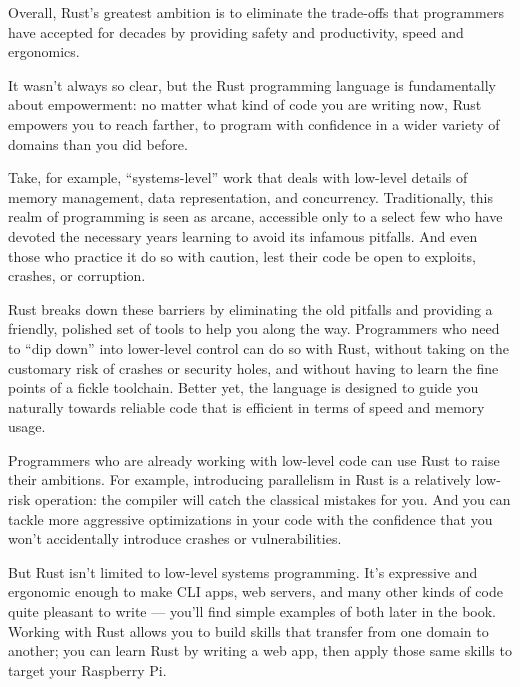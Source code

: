 Overall, Rust’s greatest ambition is to eliminate the trade-offs that programmers have accepted for decades by providing safety and productivity, speed and ergonomics. \cite{steveklabnik2018}

It wasn’t always so clear, but the Rust programming language is fundamentally about empowerment: no matter what kind of code you are writing now, Rust empowers you to reach farther, to program with confidence in a wider variety of domains than you did before.

Take, for example, “systems-level” work that deals with low-level details of memory management, data representation, and concurrency. Traditionally, this realm of programming is seen as arcane, accessible only to a select few who have devoted the necessary years learning to avoid its infamous pitfalls. And even those who practice it do so with caution, lest their code be open to exploits, crashes, or corruption.

Rust breaks down these barriers by eliminating the old pitfalls and providing a friendly, polished set of tools to help you along the way. Programmers who need to “dip down” into lower-level control can do so with Rust, without taking on the customary risk of crashes or security holes, and without having to learn the fine points of a fickle toolchain. Better yet, the language is designed to guide you naturally towards reliable code that is efficient in terms of speed and memory usage.

Programmers who are already working with low-level code can use Rust to raise their ambitions. For example, introducing parallelism in Rust is a relatively low-risk operation: the compiler will catch the classical mistakes for you. And you can tackle more aggressive optimizations in your code with the confidence that you won’t accidentally introduce crashes or vulnerabilities.

But Rust isn’t limited to low-level systems programming. It’s expressive and ergonomic enough to make CLI apps, web servers, and many other kinds of code quite pleasant to write — you’ll find simple examples of both later in the book. Working with Rust allows you to build skills that transfer from one domain to another; you can learn Rust by writing a web app, then apply those same skills to target your Raspberry Pi.


\cite{steveklabnik2018}


